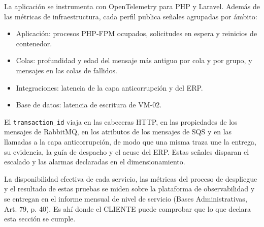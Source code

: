 La aplicación se instrumenta con OpenTelemetry para PHP y Laravel. Además de las métricas de infraestructura, cada perfil publica señales agrupadas por ámbito:

\begin{itemize}
  \item Aplicación: procesos PHP-FPM ocupados, solicitudes en espera y reinicios de contenedor.
  \item Colas: profundidad y edad del mensaje más antiguo por cola y por grupo, y mensajes en las colas de fallidos.
  \item Integraciones: latencia de la capa anticorrupción y del ERP.
  \item Base de datos: latencia de escritura de VM-02.
\end{itemize}

El \texttt{transaction\_id} viaja en las cabeceras HTTP, en las propiedades de los mensajes de RabbitMQ, en los atributos de los mensajes de SQS y en las llamadas a la capa anticorrupción, de modo que una misma traza une la entrega, su evidencia, la guía de despacho y el acuse del ERP. Estas señales disparan el escalado y las alarmas declaradas en el dimensionamiento.

La disponibilidad efectiva de cada servicio, las métricas del proceso de despliegue y el resultado de estas pruebas se miden sobre la plataforma de observabilidad y se entregan en el informe mensual de nivel de servicio (Bases Administrativas, Art. 79, p. 40). Es ahí donde el CLIENTE puede comprobar que lo que declara esta sección se cumple.
